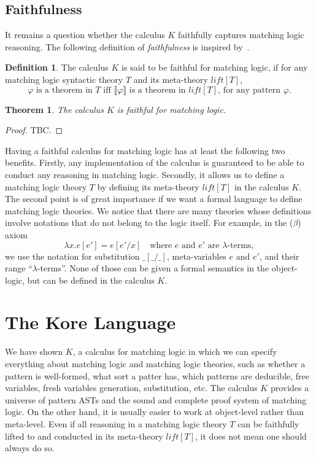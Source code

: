 \documentclass[UTF8]{article}
\newcounter{thmcounter}
\theoremstyle{plain}
\newtheorem{theorem}[thmcounter]{Theorem}
\theoremstyle{definition}
\newtheorem{definition}[thmcounter]{Definition}
\theoremstyle{remark}
\newcommand{\Bracket}[1]
    {\llbracket#1\rrbracket}
\begin{document}
\subsection{Faithfulness}
It remains a question whether the calculus $K$ faithfully captures matching logic reasoning. 
The following definition of \emph{faithfulness} is inspired by~\cite{?}.
\begin{definition}
	The calculus $K$ is said to be faithful for matching logic, if for any 
	matching logic syntactic theory $T$ and its meta-theory $\mathit{lift}[T]$,
	\begin{equation*}
	  \text{$\varphi$ is a theorem in $T$ iff $\Bracket{\varphi}$ is a theorem 
	  in $\mathit{lift}[T]$, for any pattern $\varphi$.}
	\end{equation*}
\end{definition}
\begin{theorem}
	The calculus $K$ is faithful for matching logic.
\end{theorem}
\begin{proof}
	TBC.
\end{proof}

Having a faithful calculus for matching logic has at least the following two 
benefits. 
Firstly, any implementation of the calculus is guaranteed to be able to conduct 
any reasoning in matching logic. Secondly, it allows us to define a matching 
logic theory $T$ by defining its meta-theory $\mathit{lift}[T]$ in the 
calculus $K$. 
The second 
point is of great importance if we want a formal language to define matching 
logic theories. 
We notice that there are many theories whose definitions involve notations that 
do not belong to the logic itself. For example, in the ($\beta$) axiom
$$
\lambda x . e [e'] = e[e' / x] \quad \text{where $e$ and $e'$ are 
$\lambda$-terms},
$$
we use the notation for substitution $\_[\_/\_]$, meta-variables $e$ and $e'$, 
and their range ``$\lambda$-terms''. 
None of those can be given a formal semantics in the object-logic, but can be 
defined in the calculus $K$.

\section{The Kore Language}

We have shown $K$, a calculus for matching logic in which we can specify 
everything about matching logic and matching logic theories, such as 
whether a pattern is well-formed, what sort a patter has, which patterns are 
deducible, free variables, fresh variables generation, substitution, etc.
The calculus $K$ provides a universe of pattern ASTs and the sound and complete 
proof system of matching logic. 
On the other hand, it is usually easier to work at object-level rather than 
meta-level. 
Even if all reasoning in a matching logic theory $T$ can be faithfully lifted 
to and conducted in its meta-theory $\mathit{lift}[T]$, it does not mean one 
should always do so. 
\end{document}
